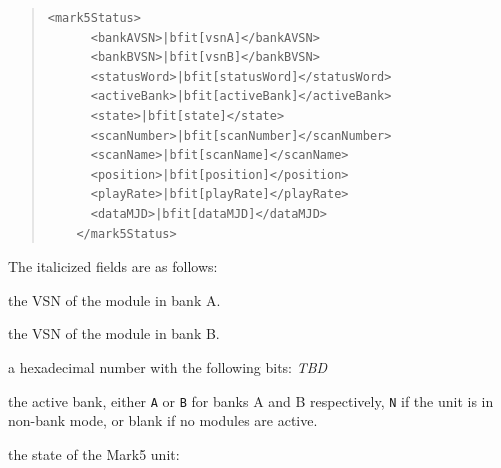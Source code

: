 \begin{description}
\begin{quotation}
\begin{Verbatim}[commandchars=\|\[\]]
    <mark5Status>
      <bankAVSN>|bfit[vsnA]</bankAVSN>
      <bankBVSN>|bfit[vsnB]</bankBVSN>
      <statusWord>|bfit[statusWord]</statusWord>
      <activeBank>|bfit[activeBank]</activeBank>
      <state>|bfit[state]</state>
      <scanNumber>|bfit[scanNumber]</scanNumber>
      <scanName>|bfit[scanName]</scanName>
      <position>|bfit[position]</position>
      <playRate>|bfit[playRate]</playRate>
      <dataMJD>|bfit[dataMJD]</dataMJD>
    </mark5Status>
\end{Verbatim}
\end{quotation}

\noindent The italicized fields are as follows:

\begin{description}
\item{} the VSN of the module in bank A.
\item{} the VSN of the module in bank B.
\item{} a hexadecimal number with the following bits:
{\em TBD}
\item{} the active bank, either {\tt A} or {\tt B} for banks A and B respectively, {\tt N} if the unit is in non-bank mode, or blank if no modules are active.
\item{} the state of the Mark5 unit:


\end{description}
\end{description}
